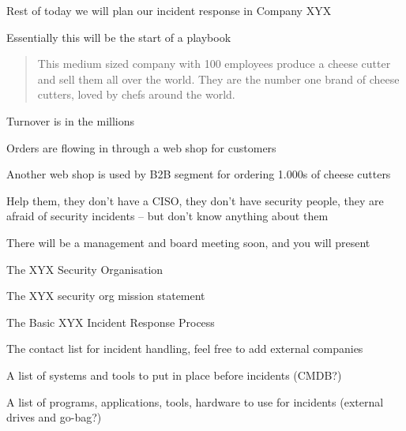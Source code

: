 \documentclass[Screen16to9,17pt]{foils}
\begin{document}
\begin{list2}
\item Rest of today we will plan our incident response in Company XYX
\item Essentially this will be the start of a playbook
\end{list2}



\begin{quote}
This medium sized company with 100 employees produce a cheese cutter and sell them all over the world. They are the number one brand of cheese cutters, loved by chefs around the world.
\end{quote}

\begin{list2}
\item Turnover is in the millions
\item Orders are flowing in through a web shop for customers
\item Another web shop is used by B2B segment for ordering 1.000s of cheese cutters
\end{list2}

Help them, they don't have a CISO, they don't have security people, they are afraid of security incidents -- but don't know anything about them




There will be a management and board meeting soon, and you will present

\begin{list2}
\item The XYX Security Organisation
\item The XYX security org mission statement
\item The Basic XYX Incident Response Process
\item The contact list for incident handling, feel free to add external companies
\item A list of systems and tools to put in place before incidents (CMDB?)
\item A list of programs, applications, tools, hardware to use for incidents (external drives and go-bag?)
\end{list2}


\end{document}
